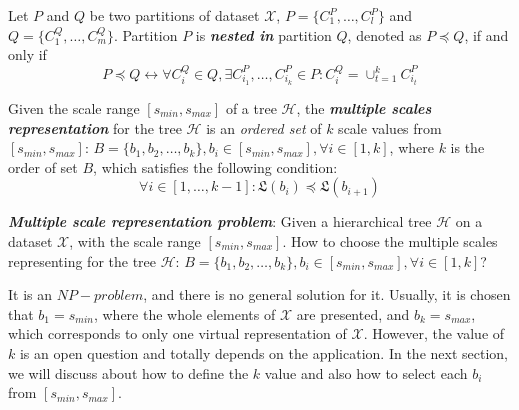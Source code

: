 \begin{definition}
\label{def:nested_in} 
Let $P$ and $Q$ be two partitions of dataset $\mathcal{X}$, $P = \{C_{1}^{P}, \ldots, C_{l}^{P}\}$ and $Q = \{C_{1}^{Q}, \ldots, C_{m}^{Q}\}$. Partition $P$ is \textbf{\textit{nested in}} partition $Q$, denoted as $P \preceq Q$, if and only if
\begin{equation}
\label{equ:nested_in}
P \preceq Q  \leftrightarrow \forall C_i^{Q} \in Q, \exists C^{P}_{i_{1}},\ldots, C^{P}_{i_{k}} \in P: C_i^Q = \cup_{t=1}^{k} C^{P}_{i_{t}}
\end{equation}
\end{definition}
\begin{definition}
\label{def:multi_scales_representation} Given the scale range $[s_{min},s_{max}]$ of a tree $\mathcal{H}$, the \textbf{\textit{multiple scales representation}} for the tree $\mathcal{H}$ is an \emph{ordered set} of $k$ scale values from $[s_{min},s_{max}]$: $\mathsf{\textit{B}} = \{b_1, b_2, \ldots, b_k\}, b_i \in [s_{min},s_{max}], \forall i \in [1,k]$, where $k$ is the order of set $\mathsf{\textit{B}}$, which satisfies the following condition:
\begin{equation}
\label{equ:multi_scales_represent}
\forall i \in [1, \ldots, k-1] : \mathfrak{L}(b_i)  \preceq \mathfrak{L}(b_{i+1})
\end{equation}
\end{definition}
\vspace{1mm}
\textit{\textbf{Multiple scale representation problem}}: Given a hierarchical tree $\mathcal{H}$ on a dataset $\mathcal{X}$, with the scale range $[s_{min},s_{max}]$. How to choose the multiple scales representing for the tree $\mathcal{H}$: $\mathsf{\textit{B}} = \{b_1, b_2, \ldots, b_k\}, b_i \in [s_{min},s_{max}], \forall i \in [1,k]$?

\vspace{2mm}
\noindent It is an $NP-problem$, and there is no general solution for it. Usually, it is chosen that $b_1 = s_{min}$, where the whole elements of $\mathcal{X}$ are presented, and $b_k = s_{max}$, which corresponds to only one virtual representation of $\mathcal{X}$. However, the value of $k$ is an open question and totally depends on the application. In the next section, we will discuss about how to define the $k$ value and also how to select each $b_i$ from $[s_{min},s_{max}]$.
